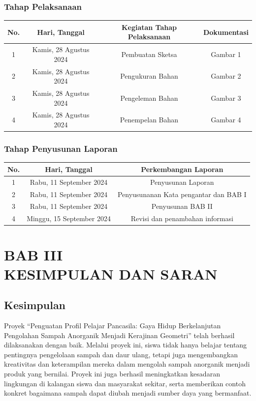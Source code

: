 \documentclass[a4paper,12pt]{article}
\begin{document}
 \subsubsection{Tahap Pelaksanaan}
 \begin{table}[ht]
     \centering
     \begin{tabular}{|c|c|c|c|}
     \hline
     \rowcolor[HTML]{9B9B9B}
     No. & Hari, Tanggal  & Kegiatan Tahap Pelaksanaan & Dokumentasi\\ \hline
     1 & Kamis, 28 Agustus 2024  & Pembuatan Sketsa & Gambar 1\\ \hline
     2 & Kamis, 28 Agustus 2024 & Pengukuran Bahan & Gambar 2\\ \hline
     3 & Kamis, 28 Agustus 2024 & Pengeleman Bahan & Gambar 3\\ \hline
     4 & Kamis, 28 Agustus 2024 & Penempelan Bahan & Gambar 4\\ \hline
     \end{tabular}
 \end{table}
\subsubsection{Tahap Penyusunan Laporan}
 \begin{table}[ht]
     \centering
     \begin{tabular}{|c|c|c|}
     \hline
     \rowcolor[HTML]{9B9B9B}
     No. & Hari, Tanggal  & Perkembangan Laporan\\ \hline
     1 & Rabu, 11 September 2024  & Penyusunan Laporan\\ \hline
     2 & Rabu, 11 September 2024 & Penyusunanan Kata pengantar dan BAB I\\ \hline
     3 & Rabu, 11 September 2024 & Penyusunan BAB II\\ \hline
     4 & Minggu, 15 September 2024 & Revisi dan penambahan informasi\\ \hline
     \end{tabular}
 \end{table}
 \pagebreak
    \section*{BAB III\\KESIMPULAN DAN SARAN}
\setcounter{section}{3}
 \setcounter{subsection}{0}
\subsection{Kesimpulan}
Proyek “Penguatan Profil Pelajar Pancasila: Gaya Hidup Berkelanjutan Pengolahan Sampah Anorganik Menjadi Kerajinan Geometri” telah berhasil dilaksanakan dengan baik. Melalui proyek ini, siswa tidak hanya belajar tentang pentingnya pengelolaan sampah dan daur ulang, tetapi juga mengembangkan kreativitas dan keterampilan mereka dalam mengolah sampah anorganik menjadi produk yang bernilai. Proyek ini juga berhasil meningkatkan kesadaran lingkungan di kalangan siswa dan masyarakat sekitar, serta memberikan contoh konkret bagaimana sampah dapat diubah menjadi sumber daya yang bermanfaat. 
\end{document}
